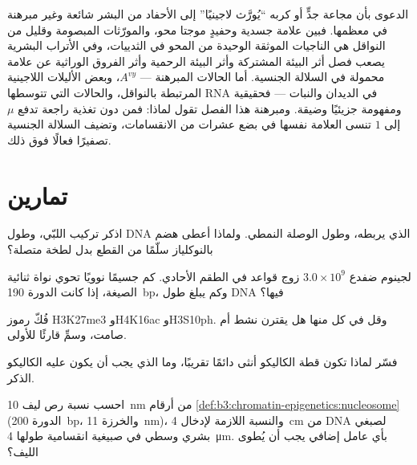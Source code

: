 \begin{remark}\label{rem:b3:chromatin-epigenetics:limits}
الدعوى بأن مجاعة جدٍّ أو كربه ``يُورَّث لاجينيًا'' إلى الأحفاد من
البشر شائعة وغير مبرهنة في معظمها. فبين علامة جسدية وحفيدٍ موجتا
محو، والمورّثات المبصومة وقليل من النواقل هي الناجيات الموثقة الوحيدة
من المحو في الثدييات، وفي الأتراب البشرية يصعب فصل أثر البيئة
المشتركة وأثر البيئة الرحمية وأثر الفروق الوراثية عن علامة محمولة في
السلالة الجنسية. أما الحالات المبرهنة --- $A^{vy}$، وبعض الأليلات
اللاجينية المرتبطة بالنواقل، والحالات التي تتوسطها RNA في الديدان
والنبات --- فحقيقية ومفهومة جزيئيًا وضيقة. ومبرهنة هذا الفصل تقول
لماذا: فمن دون تغذية راجعة تدفع $\mu$ إلى $1$ تنسى العلامة نفسها في
بضع عشرات من الانقسامات، وتضيف السلالة الجنسية تصفيرًا فعالًا فوق ذلك.
\end{remark}

\section{تمارين}

\begin{exercise}[$\star$]\label{exo:b3:chromatin-epigenetics:1}
اذكر تركيب  اللبّي، وطول DNA الذي يربطه، وطول الوصلة
النمطي. ولماذا أعطى هضم  بالنوكلياز سلّمًا من القطع بدل لطخة
متصلة؟
\end{exercise}

\begin{exercise}[$\star$]\label{exo:b3:chromatin-epigenetics:2}
لجينوم ضفدع $3.0\times 10^{9}$ زوج قواعد في الطقم الأحادي. كم جسيمًا
نوويًا تحوي نواة ثنائية الصيغة، إذا كانت الدورة \qty{190}{bp}، وكم
يبلغ طول DNA فيها؟
\end{exercise}

\begin{exercise}[$\star$]\label{exo:b3:chromatin-epigenetics:3}
فُكّ رموز H3K27me3 وH4K16ac وH3S10ph. وقل في كل منها هل يقترن 
نشط أم صامت، وسمِّ قارئًا للأولى.
\end{exercise}

\begin{exercise}[$\star$]\label{exo:b3:chromatin-epigenetics:4}
فسّر لماذا تكون قطة الكاليكو أنثى دائمًا تقريبًا، وما الذي يجب أن
يكون عليه الكاليكو الذكر.
\end{exercise}

\begin{exercise}[$\star\star$]\label{exo:b3:chromatin-epigenetics:5}
احسب نسبة رص ليف \qty{10}{nm} من أرقام
\cref{def:b3:chromatin-epigenetics:nucleosome} (الدورة \qty{200}{bp}،
والخرزة \qty{11}{nm})، والنسبة اللازمة لإدخال \qty{4}{cm} من DNA
لصبغي بشري وسطي في صبيغية انقسامية طولها
\qty{4}{\micro m}. بأي عامل إضافي يجب أن يُطوى الليف؟
\end{exercise}

